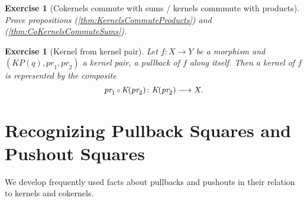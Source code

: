 \documentclass [12pt,oneside]{book}%
\theoremstyle{captionstyle}  %
\newtheorem{exercise}[theorem]{Exercise}
\newenvironment{exercises}{%
	\def\FrameCommand{{\color{Maroon}\vrule width 0pt}\hspace{0pt}\fboxsep=\FrameSep}%
	\MakeFramed{\hsize=0.95\linewidth\advance\hsize-\width\FrameRestore%
		\bigskip
		\textbf{Exercises}\vspace{-2ex}\footnotesize{
		}}
}
{\endMakeFramed}
\newcommand{\from}{\colon}				%
\newcommand{\Comp}{\raisebox{0.1ex}{\ensuremath{\,\scriptstyle{\circ}}\,}}
\newcommand{\PrjctnOnto}[1]{\textit{pr}_{#1}} 	%
\newcommand{\Ker}[1]{\textit{K}(#1)}		     	%
\newcommand{\KrnlPr}[1]{\textit{KP}\left(#1\right)}			%
\begin{document}
\begin{exercises}
\begin{exercise}[Cokernels commute with sums / kernels commmute with products]
    \label{exe:CoKernelsCommuteSums/KernelsCommuteProducts}
    Prove propositions (\ref{thm:KernelsCommuteProducts}) and (\ref{thm:CoKernelsCommuteSums}).
\end{exercise}

\begin{exercise}[Kernel from kernel pair]
    \label{thm:Kernel-KernelPair}%
    Let $f\from X\to Y$ be a morphism and $(\KrnlPr{q},\PrjctnOnto{1},\PrjctnOnto{2})$ a kernel pair, a pullback of $f$ along itself. Then a kernel of $f$ is represented by the composite
    \begin{equation*}
        \PrjctnOnto{1}\Comp \Ker{\PrjctnOnto{2}}\from \Ker{\PrjctnOnto{2}}\longrightarrow X.
    \end{equation*}
\end{exercise}
\end{exercises}

\newpage

\section[Pullback and Pushout Recognition]{Recognizing Pullback Squares and Pushout Squares}
\label{sec:PullbackPushout-Recognition}

We develop frequently used facts about pullbacks and pushouts in their relation to kernels and cokernels.
\end{document}
